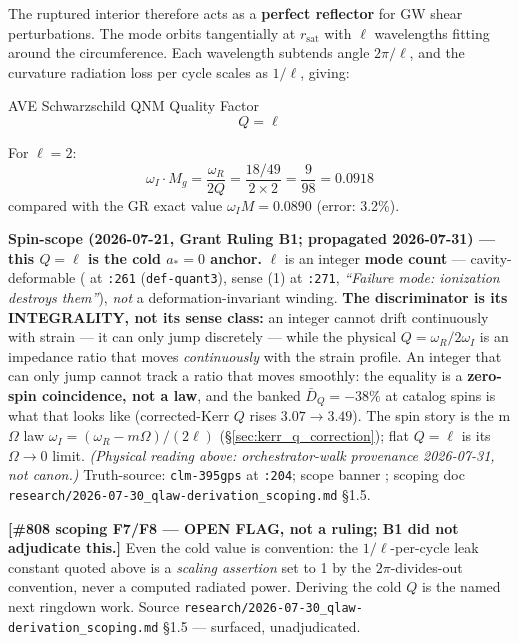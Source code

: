 The ruptured interior therefore acts as a \textbf{perfect reflector} for GW shear perturbations. The mode orbits tangentially at $r_\mathrm{sat}$ with $\ell$ wavelengths fitting around the circumference. Each wavelength subtends angle $2\pi/\ell$, and the curvature radiation loss per cycle scales as $1/\ell$, giving:
\begin{resultbox}{AVE Schwarzschild QNM Quality Factor}
\begin{equation}
    \boxed{Q = \ell}
    \label{eq:ave_qnm_Q}
\end{equation}
\end{resultbox}

\noindent For $\ell = 2$:
\begin{equation}
    \omega_I \cdot M_g = \frac{\omega_R}{2Q} = \frac{18/49}{2 \times 2} = \frac{9}{98} = 0.0918
\end{equation}
compared with the GR exact value $\omega_I M = 0.0890$ (error: 3.2\%).

\noindent\textbf{Spin-scope (2026-07-21, Grant Ruling B1; propagated 2026-07-31) --- this $Q = \ell$ is
the cold $a_* = 0$ anchor.}  $\ell$ is an integer \textbf{mode count} --- cavity-deformable ( at \texttt{:261} (\texttt{def-quant3}), sense (1) at \texttt{:271},
\emph{``Failure mode: ionization destroys them''}), \emph{not} a deformation-invariant winding.
\textbf{The discriminator is its INTEGRALITY, not its sense class:} an integer
cannot drift continuously with strain --- it can only jump discretely --- while the physical
$Q = \omega_R/2\omega_I$ is an
impedance ratio that moves \emph{continuously} with the strain profile.  An integer that can only jump
cannot track a ratio that moves smoothly: the equality is a \textbf{zero-spin coincidence, not a law},
and the banked $\bar D_Q = -38\%$ at catalog spins is what that looks like (corrected-Kerr $Q$ rises
$3.07 \to 3.49$).
The spin story is the m$\Omega$ law $\omega_I = (\omega_R - m\Omega)/(2\ell)$
(\S\ref{sec:kerr_q_correction}); flat $Q = \ell$ is its $\Omega \to 0$ limit.
\emph{(Physical reading above: orchestrator-walk provenance 2026-07-31, not canon.)}
Truth-source:  \texttt{clm-395gps} at \texttt{:204};
scope banner ; scoping doc
\texttt{research/2026-07-30\_qlaw-derivation\_scoping.md} \S1.5.

\noindent\textbf{[\#808 scoping F7/F8 --- OPEN FLAG, not a ruling; B1 did not adjudicate this.]}  Even the
cold value is convention: the $1/\ell$-per-cycle leak constant quoted above is a \emph{scaling assertion}
set to 1 by the $2\pi$-divides-out convention, never a computed radiated power.  Deriving the cold $Q$ is
the named next ringdown work.  Source
\texttt{research/2026-07-30\_qlaw-derivation\_scoping.md} \S1.5 --- surfaced, unadjudicated.

